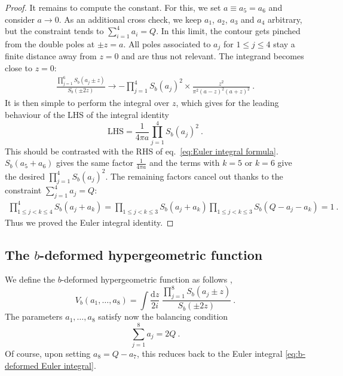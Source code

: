 \documentclass[12pt,a4paper]{article}
\newcommand{\be}{\begin{equation}}
\newcommand{\ee}{\end{equation}}
\renewcommand\d{\text{d}}
\begin{document}
\begin{proof}
It remains to compute the constant. For this, we set $a \equiv a_5=a_6$ and consider $a \to 0$. As an additional cross check, we keep $a_1$, $a_2$, $a_3$ and $a_4$ arbitrary, but the constraint tends to $\sum_{i=1}^4 a_i=Q$.
 In this limit, the contour gets pinched from the double poles at $\pm z =a$. All poles associated to $a_j$ for $1 \le j \le 4$ stay a finite distance away from $z=0$ and are thus not relevant. The integrand becomes close to $z=0$:
 \begin{align}
     \frac{\prod_{j=1}^6 S_b(a_j \pm z)}{S_b(\pm 2 z)}\to -\prod_{j=1}^4 S_b(a_j)^2 \times \frac{z^2}{\pi^2(a-z)^2(a+z)^2}\ .
 \end{align}
 It is then simple to perform the integral over $z$, which gives for the leading behaviour of the LHS of the integral identity
 \be 
\text{LHS}=\frac{1}{4\pi a} \prod_{j=1}^4 S_b(a_j)^2\ .
 \ee
 This should be contrasted with the RHS of eq.~\eqref{eq:Euler integral formula}. $S_b(a_5+a_6)$ gives the same factor $\frac{1}{4\pi a}$ and the terms with $k=5$ or $k=6$ give the desired $\prod_{j=1}^4 S_b(a_j)^2$. The remaining factors cancel out thanks to the constraint $\sum_{j=1}^4 a_j=Q$:
 \begin{align}
    \prod_{1\le j<k\le 4}^4 S_b(a_j+a_k)=\prod_{1 \le j<k \le 3} S_b(a_j+a_k) \prod_{1 \le j<k\le 3} S_b(Q-a_j-a_k)=1\ .
 \end{align}
Thus we proved the Euler integral identity.
\end{proof}



\subsection{The \texorpdfstring{$b$}{b}-deformed hypergeometric function}
We define the $b$-deformed hypergeometric function as follows \cite{Spridonov:theta},
\be 
V_b(a_1,\dots,a_8)= \int \frac{\d z}{2i}\ \frac{\prod_{j=1}^8 S_b(a_j \pm z)}{S_b(\pm 2z)}\ . \label{eq:b-deformed hypergeometric function}
\ee
The parameters $a_1,\dots,a_8$ satisfy now the balancing condition
\be 
\sum_{j=1}^8 a_j=2Q\ .
\ee
Of course, upon setting $a_8=Q-a_7$, this reduces back to the Euler integral \eqref{eq:b-deformed Euler integral}.
\end{document}
